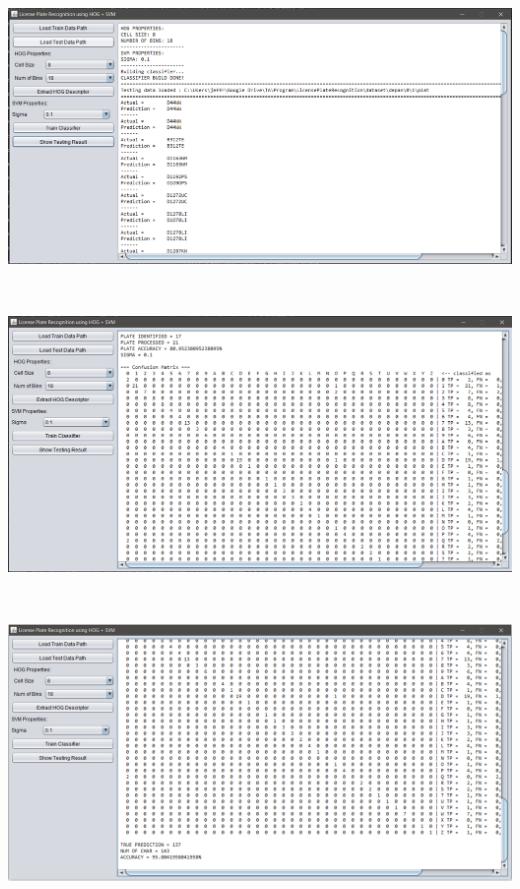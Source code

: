 \begin{adjustbox}{width=1\textwidth}
	\noindent\begin{minipage}{\linewidth}
		\centering\includegraphics[width=16cm]{images/TampilanAntarmukaTesting1.png}
		\label{fig:TampilanAntarmukaTesting1}
	\end{minipage}
\end{adjustbox}\\
\begin{adjustbox}{width=1\textwidth}
	\noindent\begin{minipage}{\linewidth}
		\centering\includegraphics[width=16cm]{images/TampilanAntarmukaTesting2.png}
		\label{fig:TampilanAntarmukaTesting2}
	\end{minipage}
\end{adjustbox}\\
\begin{adjustbox}{width=1\textwidth}
	\noindent\begin{minipage}{\linewidth}
		\centering\includegraphics[width=16cm]{images/TampilanAntarmukaTesting3.png}
		\label{fig:TampilanAntarmukaTesting3}
	\end{minipage}
\end{adjustbox}\\
